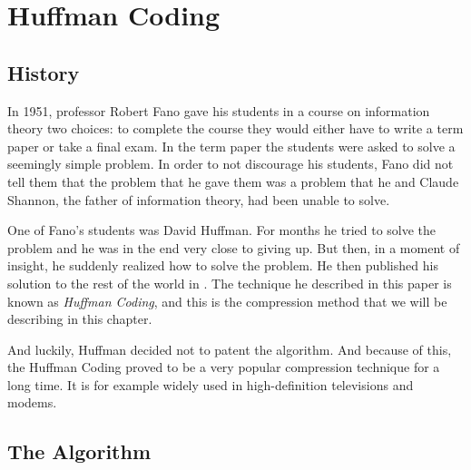 \begin{comment}
  
\end{comment}


\chapter{Huffman Coding}
\label{cha:crc}

\section{History}

In 1951, professor Robert Fano gave his students in a course on
information theory two choices: to complete the course they would
either have to write a term paper or take a final exam. In the term
paper the students were asked to solve a seemingly simple problem. In
order to not discourage his students, Fano did not tell them that the
problem that he gave them was a problem that he and Claude Shannon,
the father of information theory, had been unable to
solve\cite{stix91:_profil}.

One of Fano's students was David Huffman. For months he tried to solve
the problem and he was in the end very close to giving up. But then,
in a moment of insight, he suddenly realized how to solve the
problem. He then published his solution to the rest of the world in
\cite{huf52}. The technique he described in this paper is known as
\textit{Huffman Coding}, and this is the compression method that we
will be describing in this chapter.

And luckily, Huffman decided not to patent the algorithm. And because
of this, the Huffman Coding proved to be a very popular compression
technique for a long time. It is for example widely used in
high-definition televisions and modems.

\section{The Algorithm}

